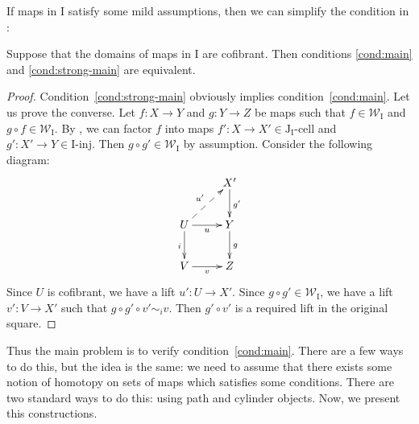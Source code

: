 \documentclass{tac}
\theoremstyle{definition}
\newcommand{\we}{\mathcal{W}}
\newcommand{\I}{\mathrm{I}}
\newcommand{\J}{\mathrm{J}}
\newcommand{\class}[2]{#1\text{-}\mathrm{#2}}
\newcommand{\Iinj}[1][\I]{\class{#1}{inj}}
\newcommand{\Icell}[1][\I]{\class{#1}{cell}}
\newcommand{\Jcell}[1][]{\Icell[\J#1]}
\begin{document}
If maps in $\I$ satisfy some mild assumptions, then we can simplify the condition in :
\begin{prop}[main]
Suppose that the domains of maps in $\I$ are cofibrant.
Then conditions \eqref{cond:main} and \eqref{cond:strong-main} are equivalent.
\end{prop}
\begin{proof}
Condition~\eqref{cond:strong-main} obviously implies condition~\eqref{cond:main}.
Let us prove the converse.
Let $f : X \to Y$ and $g : Y \to Z$ be maps such that $f \in \we_\I$ and $g \circ f \in \we_\I$.
By , we can factor $f$ into maps $f' : X \to X' \in \Jcell[_\I]$ and $g' : X' \to Y \in \Iinj$.
Then $g \circ g' \in \we_\I$ by assumption.
Consider the following diagram:
\[ \xymatrix{ & X' \ar[d]^{g'} \\
              U \ar[r]_u \ar[d]_i \ar@{-->}[ur]^{u'} & Y \ar[d]^g \\
              V \ar[r]_v & Z
            } \]
Since $U$ is cofibrant, we have a lift $u' : U \to X'$.
Since $g \circ g' \in \we_\I$, we have a lift $v' : V \to X'$ such that $g \circ g' \circ v' \sim_i v$.
Then $g' \circ v'$ is a required lift in the original square.
\end{proof}

Thus the main problem is to verify condition~\eqref{cond:main}.
There are a few ways to do this, but the idea is the same:
we need to assume that there exists some notion of homotopy on sets of maps which satisfies some conditions.
There are two standard ways to do this: using path and cylinder objects.
Now, we present this constructions.
\end{document}
